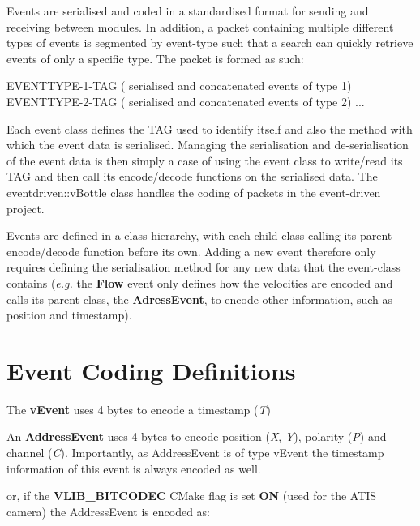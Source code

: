 Events are serialised and coded in a standardised format for sending and receiving between modules. In addition, a packet containing multiple different types of events is segmented by event-\/type such that a search can quickly retrieve events of only a specific type. The packet is formed as such\+: 
\begin{DoxyCode}
EVENTTYPE-1-TAG ( serialised and concatenated events of type 1) EVENTTYPE-2-TAG ( serialised and
       concatenated events of type 2) ...
\end{DoxyCode}
 Each event class defines the T\+AG used to identify itself and also the method with which the event data is serialised. Managing the serialisation and de-\/serialisation of the event data is then simply a case of using the event class to write/read its T\+AG and then call its encode/decode functions on the serialised data. The {\ttfamily eventdriven\+::v\+Bottle} class handles the coding of packets in the event-\/driven project.

Events are defined in a class hierarchy, with each child class calling its parent encode/decode function before its own. Adding a new event therefore only requires defining the serialisation method for any new data that the event-\/class contains ({\itshape e.\+g.} the {\bfseries Flow} event only defines how the velocities are encoded and calls its parent class, the {\bfseries Adress\+Event}, to encode other information, such as position and timestamp).

 \section*{Event Coding Definitions}

The {\bfseries v\+Event} uses 4 bytes to encode a timestamp ({\itshape T}) 
\begin{DoxyCode}
\end{DoxyCode}
 An {\bfseries Address\+Event} uses 4 bytes to encode position ({\itshape X}, {\itshape Y}), polarity ({\itshape P}) and channel ({\itshape C}). Importantly, as Address\+Event is of type {\ttfamily v\+Event} the timestamp information of this event is always encoded as well. 
\begin{DoxyCode}
\end{DoxyCode}
 or, if the {\bfseries V\+L\+I\+B\+\_\+B\+I\+T\+C\+O\+D\+EC} C\+Make flag is set {\bfseries ON} (used for the A\+T\+IS camera) the Address\+Event is encoded as\+: 
\begin{DoxyCode}
\end{DoxyCode}


